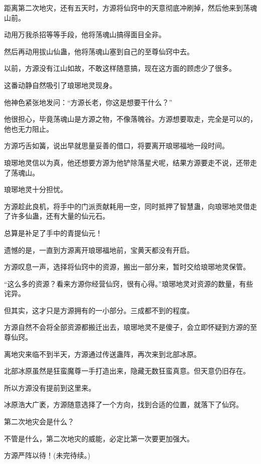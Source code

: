 \begin{this_body}
距离第二次地灾，还有五天时，方源将仙窍中的天意彻底冲刷掉，然后他来到荡魂山前。

动用万我杀招等等手段，他将荡魂山搞得面目全非。

然后再动用拔山仙蛊，他将荡魂山塞到自己的至尊仙窍中去。

以前，方源没有江山如故，不敢这样随意搞，现在这方面的顾虑少了很多。

这番动静自然吸引了琅琊地灵现身。

他神色紧张地发问：“方源长老，你这是想要干什么？”

他很担心，毕竟荡魂山是方源之物，不像落魄谷。方源想要取走，完全是可以的，他也无力阻止。

方源巧舌如簧，说出早就思量妥善的借口，将要离开琅琊福地一段时间。

琅琊地灵信以为真，他还想要方源为他铲除落星犬呢，结果方源要走不说，还带走了荡魂山。

琅琊地灵十分担忧。

方源趁此良机，将手中的门派贡献耗用一空，同时抵押了智慧蛊，向琅琊地灵借走了许多仙蛊，还有大量的仙元石。

总算是补足了手中的青提仙元！

遗憾的是，一直到方源离开琅琊福地前，宝黄天都没有开启。

方源叹息一声，选择将仙窍中的资源，搬出一部分来，暂时交给琅琊地灵保管。

“这么多的资源？看来方源你经营仙窍，很有心得。”琅琊地灵对资源的数量，有些诧异。

但其实，这才只是方源拥有的一小部分。三成都不到的程度。

方源自然不会将全部资源都搬迁出去，琅琊地灵不是傻子，会立即怀疑到方源的至尊仙窍。

离地灾来临不到半天，方源通过传送蛊阵，再次来到北部冰原。

北部冰原虽然是狂蛮魔尊一手打造出来，隐藏无数狂蛮真意。但天意仍旧存在。

所以方源没有提前到这里来。

冰原浩大广袤，方源随意选择了一个方向，找到合适的位置，就落下了仙窍。

第二次地灾会是什么？

不管是什么，第二次地灾的威能，必定比第一次要更加强大。

方源严阵以待！(未完待续。)

\end{this_body}

